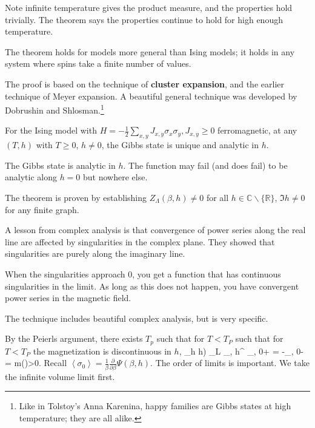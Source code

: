 \documentclass[12pt]{book}
\theoremstyle{norm}
\begin{document}
Note infinite temperature gives the product measure, and the properties hold trivially. The theorem says the properties continue to hold for high enough temperature.

The theorem holds for models more general than Ising models; it holds in any system where spins take a finite number of values.


The proof is based on the technique of \textbf{cluster expansion}, and the earlier technique of Meyer expansion. A beautiful general technique was developed by Dobrushin %
and Shlosman.\footnote{Like in Tolstoy's Anna Karenina, happy families are Gibbs states at high temperature; they are all alike.}

\begin{theorem}
For the Ising model with $H=-\frac{1}{2} \sum_{x,y} J_{x,y} \sigma_x\sigma_y, J_{x,y} \ge 0$ ferromagnetic, at any $(T,h)$ with $T\ge 0$, $h\ne 0$, the Gibbs state is unique and analytic in $h$. %
\end{theorem}
The Gibbs state is analytic in $h$. The function may fail (and does fail) to be analytic along $h=0$ but nowhere else. 

The theorem is proven by establishing $Z_\Lambda (\beta, h)\ne 0$ for all $h\in \mathbb{C}\backslash \{\mathbb{R}\}$, $\Im h\ne 0$ for any finite graph.

A lesson from complex analysis is that convergence of power series along the real line are affected by singularities in the complex plane. They showed that singularities are purely along the imaginary line.

When the singularities approach 0, you get a function that has continuous singularities in the limit. As long as this does not happen, you have convergent power series in the magnetic field.

The technique includes beautiful complex analysis, but is very specific.

By the Peierls argument, there exists $T_p$ such that for $T<T_P$ such that for $T<T_P$ the magnetization is discontinuous in $h$,
\be
\lim_{h
h)}
\lim_{L\nearrow \infty} \left{}\right\rangle_{\beta, h}^{}
\left{}\right\rangle_{\beta, 0+} = -\left{}\right\rangle_{\beta, 0-} = m(\beta)>0.
\ee
Recall $\left\langle {\sigma_0}\right\rangle = \frac{1}{\beta} \frac{\partial}{\partial \beta}\Psi(\beta, h)$.
The order of limits is important. We take the infinite volume limit first.
\end{document}
